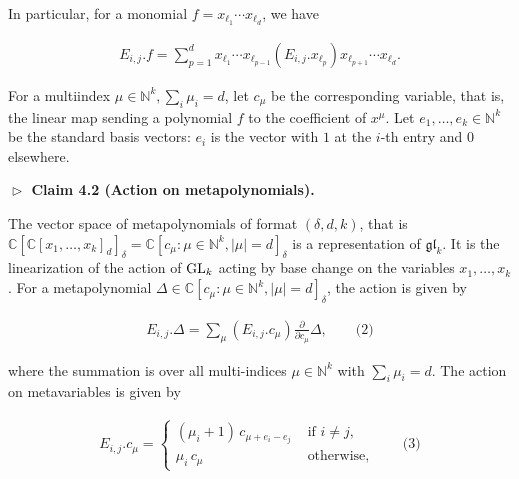 \documentclass[10pt,a4paper]{article}
\begin{document}
In particular, for a monomial $f=x_{\ell_{1}}\cdots x_{\ell_{d}}$, we have



\[\begin{aligned}
E_{i,j}.f=\textstyle\sum_{p=1}^{d}x_{\ell_{1}}\cdots x_{\ell_{p-1}}(E_{i,j}.x_{\ell_{p}})x_{\ell_{p+1}}\cdots x_{\ell_{d}}.
\end{aligned}\]





For a multiindex $\mu\in\mathbb{N}^{k},\sum_{i}\mu_{i}=d$, let $c_{\mu}$ be the corresponding variable, that is, the linear map sending a polynomial $f$ to the coefficient of $x^{\mu}$. Let $e_{1},\ldots,e_{k}\in\mathbb{N}^{k}$ be the standard basis vectors: $e_{i}$ is the vector with $1$ at the $i$-th entry and $0$ elsewhere.





\par\medskip\noindent\textbf{$\vartriangleright$ Claim 4.2 (Action on metapolynomials).}\par



The vector space of metapolynomials of format $(\delta,d,k)$, that is $\mathbb{C}[\mathbb{C}[x_{1},\ldots,x_{k}]_{d}]_{\delta}=\mathbb{C}[c_{\mu}:\mu\in\mathbb{N}^{k},|\mu|=d]_{\delta}$ is a representation of $\mathfrak{gl}_{k}$. It is the linearization of the action of $\textnormal{GL}_{k}$ acting by base change on the variables $x_{1},\ldots,x_{k}$.
For a metapolynomial $\Delta\in\mathbb{C}[c_{\mu}:\mu\in\mathbb{N}^{k},|\mu|=d]_{\delta}$, the action is given by





\[\begin{aligned}
\displaystyle E_{i,j}.\Delta=\sum_{\mu}(E_{i,j}.c_{\mu})\frac{\partial}{\partial c_{\mu}}\Delta,\qquad\text{(2)}
\end{aligned}\]


where the summation is over all multi-indices $\mu\in\mathbb{N}^{k}$ with $\sum_{i}\mu_{i}=d$. The action on metavariables is given by



\[\begin{aligned}
E_{i,j}.c_{\mu}=\begin{cases}(\mu_{i}+1)\,c_{\mu+e_{i}-e_{j}}&\text{ if }i\neq j,\\ \mu_{i}\,c_{\mu}&\text{ otherwise},\end{cases}\qquad\text{(3)}
\end{aligned}\]
\end{document}
